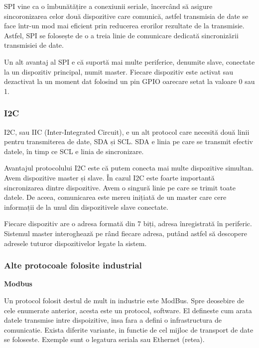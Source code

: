 SPI vine ca o îmbunătățire a conexiunii seriale, încercând să asigure
sincoronizarea celor două dispozitive care comunică, astfel transmisia de date
se face într-un mod mai eficient prin reducerea erorilor rezultate de la
transmisie. Astfel, SPI se folosește de o a treia linie de comunicare dedicată
sincronizării transmisiei de date.

Un alt avantaj al SPI e că suportă mai multe periferice, denumite slave,
conectate la un dispozitiv principal, numit master. Fiecare dispozitiv este
activat sau dezactivat la un moment dat folosind un pin GPIO oarecare setat la
valoare 0 sau 1.

\subsubsection{I2C}
\label{sec:embed-bus-wire-i2c}

I2C, sau IIC (Inter-Integrated Circuit), e un alt protocol care necesită două
linii pentru transmiterea de date, SDA și SCL. SDA e linia pe care se transmit
efectiv datele, în timp ce SCL e linia de sincronizare.

Avantajul protocolului I2C este că putem conecta mai multe dispozitive simultan.
Avem dispozitive master și slave. În cazul I2C este foarte importantă
sincronizarea dintre dispozitive. Avem o singură linie pe care se trimit toate
datele. De aceea, comunicarea este mereu inițiată de un master care cere
informații de la unul din dispozitivele slave conectate.

Fiecare dispozitiv are o adresa formată din 7 biți, adresa înregistrată în
periferic. Sistemul master interoghează pe rând fiecare adresa, putând astfel să
descopere adresele tuturor dispozitivelor legate la sistem.

\subsubsection{Alte protocoale folosite industrial}
\label{sec:embed-bus-wire-other}

\textbf{Modbus}

Un protocol folosit destul de mult in industrie este ModBus. Spre deosebire de
cele enumerate anterior, acesta este un protocol, software. El defineste cum
arata datele transmise intre dispoizitive, insa fara a defini o infrastructura
de comunicatie. Exista diferite variante, in functie de cel mijloc de transport
de date se foloseste. Exemple sunt o legatura seriala sau Ethernet (retea).

